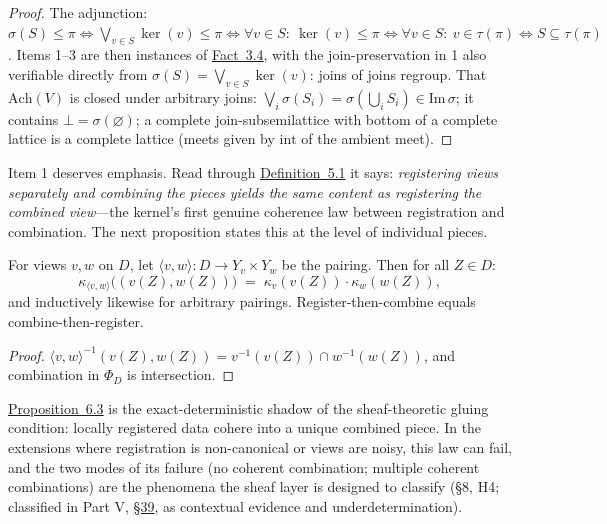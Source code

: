 \begin{proof}

The adjunction: \(\sigma(S) \le \pi \iff \bigvee_{v \in S}\ker(v) \le \pi \iff \forall v \in S:\ \ker(v) \le \pi \iff \forall v \in S:\ v \in \tau(\pi) \iff S \subseteq \tau(\pi)\). Items 1--3 are then instances of \hyperlink{stmt:3.4}{Fact~3.4}, with the join-preservation in 1 also verifiable directly from \(\sigma(S) = \bigvee_{v\in S} \ker(v)\): joins of joins regroup. That \(\mathrm{Ach}(V)\) is closed under arbitrary joins: \(\bigvee_i \sigma(S_i) = \sigma(\bigcup_i S_i) \in \mathrm{Im}\,\sigma\); it contains \(\bot = \sigma(\varnothing)\); a complete join-subsemilattice with bottom of a complete lattice is a complete lattice (meets given by \(\mathrm{int}\) of the ambient meet).
\end{proof}

Item 1 deserves emphasis. Read through \hyperlink{stmt:5.1}{Definition~5.1} it says: \emph{registering views separately and combining the pieces yields the same content as registering the combined view}---\hspace{0pt}the kernel's first genuine coherence law between registration and combination. The next proposition states this at the level of individual pieces.

\begin{thmplain}

For views \(v, w\) on \(D\), let \(\langle v, w \rangle : D \to Y_v \times Y_w\) be the pairing. Then for all \(Z \in D\):
\[
\kappa_{\langle v, w \rangle}\big( (v(Z), w(Z)) \big) \;=\; \kappa_v(v(Z)) \cdot \kappa_w(w(Z)),
\]
and inductively likewise for arbitrary pairings. Register-then-combine equals combine-then-register.
\end{thmplain}

\begin{proof}

\(\langle v,w\rangle^{-1}(v(Z), w(Z)) = v^{-1}(v(Z)) \cap w^{-1}(w(Z))\), and combination in \(\Phi_D\) is intersection.
\end{proof}

\hyperlink{stmt:6.3}{Proposition~6.3} is the exact-deterministic shadow of the sheaf-theoretic gluing condition: locally registered data cohere into a unique combined piece. In the extensions where registration is non-canonical or views are noisy, this law can fail, and the two modes of its failure (no coherent combination; multiple coherent combinations) are the phenomena the sheaf layer is designed to classify (§8, H4; classified in Part V, \hyperlink{sec:39}{§39}, as contextual evidence and underdetermination).

